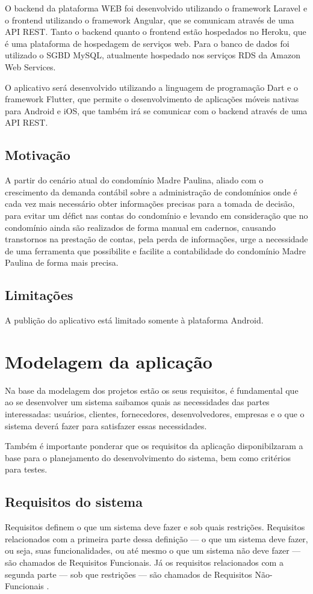 \documentclass[12pt]{article}
\begin{document}
O backend da plataforma WEB foi desenvolvido utilizando o framework Laravel e o frontend utilizando o framework Angular, que se comunicam através de uma API REST.
Tanto o backend quanto o frontend estão hospedados no Heroku, que é uma plataforma de hospedagem de serviços web. Para o banco de dados foi utilizado o SGBD MySQL, atualmente hospedado nos serviços RDS da Amazon Web Services.

O aplicativo será desenvolvido utilizando a linguagem de programação Dart e o framework Flutter, que permite o desenvolvimento de aplicações móveis nativas para Android e iOS, que também irá se comunicar com o backend através de uma API REST.

\subsection{Motivação}
A partir do cenário atual do condomínio Madre Paulina, aliado com o crescimento da demanda contábil sobre a administração de condomínios onde é cada vez mais necessário obter informações precisas para a tomada de decisão, para evitar um défict nas contas do condomínio e levando em consideração que no condomínio ainda são realizados de forma manual em cadernos, causando transtornos na prestação de contas, pela perda de informações, urge a necessidade de uma ferramenta que possibilite e facilite a contabilidade do condomínio Madre Paulina de forma mais precisa.

\subsection{Limitações}
A publição do aplicativo está limitado somente à plataforma Android.

\section{Modelagem da aplicação}
Na base da modelagem dos projetos estão os seus requisitos, é fundamental que ao se desenvolver um sistema saibamos quais as necessidades das partes interessadas: usuários, clientes, fornecedores, desenvolvedores, empresas e o que o sistema deverá fazer para satisfazer essas necessidades.

Também é importante ponderar que os requisitos da aplicação disponibilzaram a base para o planejamento do desenvolvimento do sistema, bem como critérios para testes.

\subsection{Requisitos do sistema}
Requisitos definem o que um sistema deve fazer e sob quais restrições. Requisitos relacionados com a primeira parte dessa definição — o que um sistema deve fazer, ou seja, suas funcionalidades, ou até mesmo o que um sistema não deve fazer — são chamados de Requisitos Funcionais. Já os requisitos relacionados com a segunda parte — sob que restrições — são chamados de Requisitos Não-Funcionais \cite[Capítulo 3.1]{engsoftware}.
\end{document}
